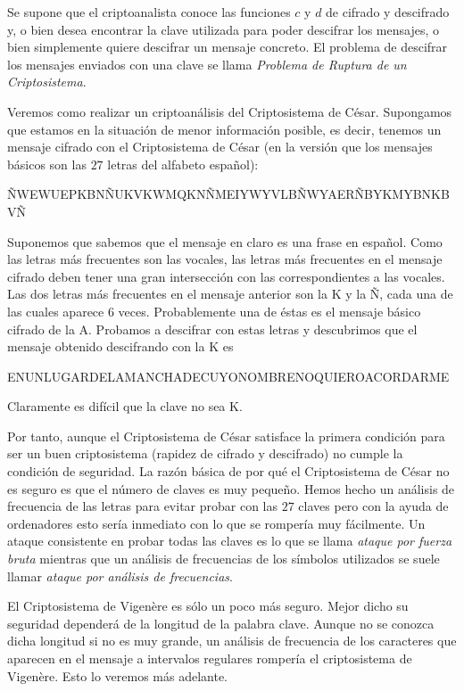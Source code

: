 Se supone que el criptoanalista conoce las funciones $c$ y $d$ de cifrado y descifrado y, o bien desea encontrar la clave utilizada para poder descifrar los mensajes, o bien simplemente quiere descifrar un mensaje concreto. El problema de descifrar los mensajes enviados con una clave se llama {\it Problema de Ruptura de un Criptosistema}.

Veremos como realizar un criptoanálisis del Criptosistema de César. Supongamos que estamos en la situación de menor información posible, es decir, tenemos un mensaje cifrado con el Criptosistema de César (en la versión que los mensajes básicos son las $27$ letras del alfabeto español):
\begin{center}
    ÑWEWUEPKBNÑUKVKWMQKNÑMEIYWYVLBÑWYAERÑBYKMYBNKBVÑ
\end{center}
Suponemos que sabemos que el mensaje en claro es una frase en español. Como las letras más frecuentes son las vocales, las letras más frecuentes en el mensaje cifrado deben tener una gran intersección con las correspondientes a las vocales. Las dos letras más frecuentes en el mensaje anterior son la K y la Ñ, cada una de las cuales aparece $6$ veces. Probablemente una de éstas es el mensaje básico cifrado de la A. Probamos a descifrar con estas letras y descubrimos que el mensaje obtenido descifrando con la K es
\begin{center}
    ENUNLUGARDELAMANCHADECUYONOMBRENOQUIEROACORDARME
\end{center}
Claramente es difícil que la clave no sea K.

Por tanto, aunque el Criptosistema de César satisface la primera condición para ser un buen criptosistema (rapidez de cifrado y descifrado) no cumple la condición de seguridad. La razón básica de por qué el Criptosistema de César no es seguro es que el número de claves es muy pequeño. Hemos hecho un análisis de frecuencia de las letras para evitar probar con las $27$ claves pero con la ayuda de ordenadores esto sería inmediato con lo que se rompería muy fácilmente. Un ataque consistente en probar todas las claves es lo que se llama {\it ataque por fuerza bruta} mientras que un análisis de frecuencias de los símbolos utilizados se suele llamar {\it ataque por análisis de frecuencias}.

El Criptosistema de Vigenère es sólo un poco más seguro. Mejor dicho su seguridad dependerá de la longitud de la palabra clave. Aunque no se conozca dicha longitud si no es muy grande, un análisis de frecuencia de los caracteres que aparecen en el mensaje a intervalos regulares rompería el criptosistema de Vigenère. Esto lo veremos más adelante.

